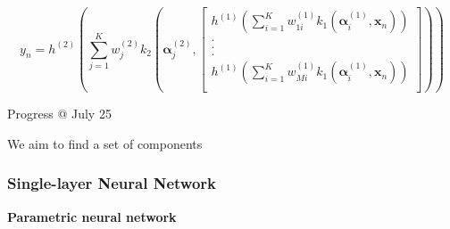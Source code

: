 \documentclass{article}
\begin{document}
\begin{equation}
y_n = h^{(2)} \left( \sum\limits_{j=1}^K w_j^{(2)} k_2( \bm{\alpha}_j^{(2)}, \left[ \begin{array}{c}
	h^{(1)} \left( \sum\limits_{i=1}^K w_{1i}^{(1)} k_1(\bm{\alpha}_i^{(1)},\mathbf{x}_n) \right)\\
	.\\
	.\\
	.\\
	h^{(1)} \left( \sum\limits_{i=1}^K w_{Mi}^{(1)} k_1(\bm{\alpha}_i^{(1)},\mathbf{x}_n) \right)\\
\end{array}
\right])
\right) 
\end{equation}

\newpage
\par\par\LARGE Progress @ July 25\normalsize

We aim to find a set of components 
\subsubsection{Single-layer Neural Network}
\par \textbf{Parametric neural network}\\




\newpage


\end{document}

